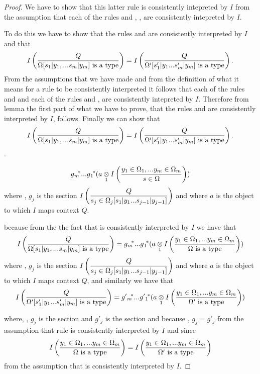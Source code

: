 \begin{proof}
We have to show that this latter rule is consistently intepreted by $I$ from the assumption that each of the rules  and
, \foreachj, are consistently intepreted by $I$.

To do this we have to show that the rules \ZOmegaSUBsmFORym and 
are consistently interpreted by $I$ and that
$$
\Imappedrule{Q}{\isT{\Omega[\SUBsmFORym]}} = \Imappedrule{Q}{\isT{\Omega'[s'_1|y_1...s'_m|y_m]}}.
$$
From the assumptions that we have made and from the definition of what it means for a rule to be consistently interpreted it follows that
each of the rules
\ZOmega
and
and each of the rules
and
\foreachj, are consistently intepreted by $I$. Therefore from lemma  
the first part of what we have to prove, that the rules \ZOmegaSUBsmFORym and 
are consistently interpreted by $I$, follows.
Finally we can show that
$$
\Imappedrule{Q}{\isT{\Omega[\SUBsmFORym]}} = \Imappedrule{Q}{\isT{\Omega'[s'_1|y_1...s'_m|y_m]}}.
$$.

\begin{newtt}
$$ \gmstar...\gonestar(\crossx{a}{\Imappedrule{\yOmega{m}}{\ofT{s}{\Omega}}}{1})$$
where \foreachj, $g_j$ is the section
$\displaystyle\Imappedrule{Q}{ \ofT{s_j}{\Omega_j [s_1|y_1...s_{j-1}|y_{j-1}]}}$
and where $a$ is the object to which $I$ maps context $Q$.

\end{newtt}

because  from the the fact  that \ZOmegaSUBsmFORym is consistently interpreted by $I$ we have that
$$
\Imappedrule{Q}{\isT{\Omega[\SUBsmFORym]}} = \gmstar...\gonestar(\crossx{a}{\Imappedrule{\yOmega{m}}{\isT{\Omega}}}{1})
$$
where \foreachj, $g_j$ is the section
$\displaystyle\Imappedrule{Q}{ \ofT{s_j}{\Omega_j [s_1|y_1...s_{j-1}|y_{j-1}]}}$
and where $a$ is the object to which $I$ maps context $Q$,
and similarly we have that
$$
\Imappedrule{Q}{\isT{\Omega'[s'_1|y_1...s'_m|y_m]}} = \gprimemstar...\gprimeonestar(\crossx{a}{\Imappedrule{\yOmega{m}}{\isT{\Omega'}}}{1})
$$

where, \foreachj,  
$g_j$ is the section 
and $g'_j$ is the section 
and because \foreachj, $g_j=g'_j$ from the assumption
that rule  is consistently interpreted by $I$
and since
$$
\Imappedrule{\yOmega{m}}{\isT{\Omega}} = \Imappedrule{\yOmega{m}}{\isT{\Omega'}}
$$
from the assumption that  is consistently interpreted by $I$.



\end{proof}
